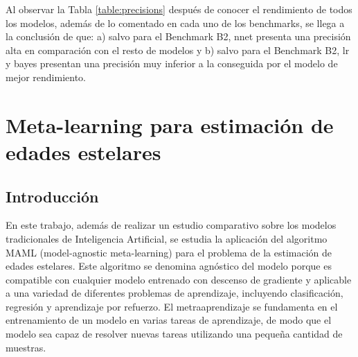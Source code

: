 Al observar la Tabla \ref{table:precisions} después de conocer el rendimiento de todos los modelos, además de lo comentado en cada uno de los benchmarks, se llega a la conclusión de que: a) salvo para el Benchmark B2, nnet presenta una precisión alta en comparación con el resto de modelos y b) salvo para el Benchmark B2, lr y bayes presentan una precisión muy inferior a la conseguida por el modelo de mejor rendimiento.

\begin{table}[H]
\centering
{}%
\caption{Precisión de todos los métodos en los diferentes benchmarks. La precisión se mide como el porcentaje de estimaciones de edad que caen dentro del margen de confianza asociado a cada estrella.}\label{table:precisions}
\end{table}


\chapter{Meta-learning para estimación de edades estelares}
 
\section{Introducción}

En este trabajo, además de realizar un estudio comparativo sobre los modelos tradicionales de Inteligencia Artificial, se estudia la aplicación del algoritmo MAML (model-agnostic meta-learning) para el problema de la estimación de edades estelares. Este algoritmo se denomina agnóstico del modelo porque es compatible con cualquier modelo entrenado con descenso de gradiente y aplicable a una variedad de diferentes problemas de aprendizaje, incluyendo clasificación, regresión y aprendizaje por refuerzo. El metraaprendizaje se fundamenta en el entrenamiento de un modelo en varias tareas de aprendizaje, de modo que el modelo sea capaz de resolver nuevas tareas utilizando una pequeña cantidad de muestras.

